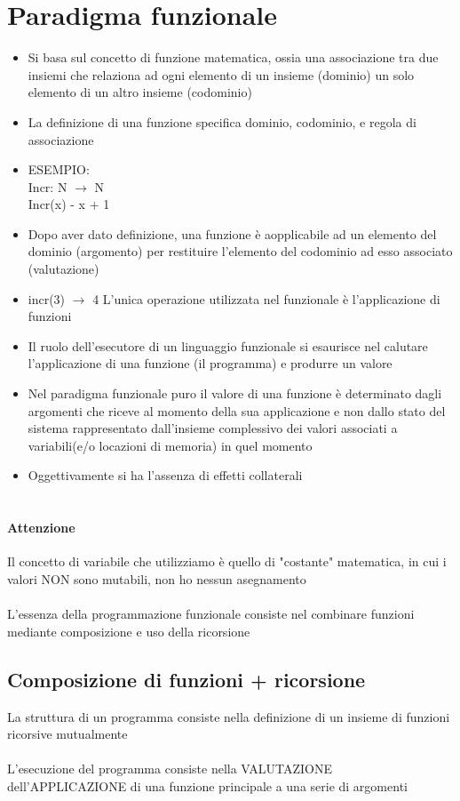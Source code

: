 \documentclass[12pt, a4paper, openany, oneside]{book}
\begin{document}
{\section{Paradigma funzionale}
\begin{itemize}
	\item 
	Si basa sul concetto di funzione matematica, ossia una associazione tra due 
	insiemi che relaziona ad ogni elemento di un insieme (dominio) un solo 
	elemento di un altro insieme (codominio)
	\item La definizione di una funzione specifica dominio, codominio, e regola
	di associazione 
	\\
	\item ESEMPIO: \\
	Incr: N $\to$ N \\
	Incr(x) - x + 1
	\item Dopo aver dato definizione, una funzione è aopplicabile ad un elemento del 
	dominio (argomento) per restituire l'elemento del codominio ad esso associato
	(valutazione)
	\item incr(3) $\to$ 4 
	L'unica operazione utilizzata nel funzionale è l'applicazione di funzioni  
	\item Il ruolo dell'esecutore di un linguaggio funzionale si esaurisce nel 
	calutare l'applicazione di una funzione (il programma) e produrre un valore 
	\item Nel paradigma funzionale puro il valore di una funzione è determinato 
	dagli argomenti che riceve al momento della sua applicazione e non dallo 
	stato del sistema rappresentato dall'insieme complessivo dei valori 
	associati a variabili(e/o locazioni di memoria) in quel momento 
	\item Oggettivamente si ha l'assenza di effetti collaterali \\ \\
\end{itemize}
\paragraph{Attenzione} %
\label{par:attenzione}
Il concetto di variabile che utilizziamo è quello di "costante" matematica, in 
cui i valori NON sono mutabili, non ho nessun asegnamento
\\ \\
L'essenza della programmazione funzionale consiste nel combinare funzioni 
mediante composizione e uso della ricorsione
\subsection{Composizione di funzioni + ricorsione} 
La struttura di un programma consiste nella definizione di un insieme di 
funzioni ricorsive mutualmente
\\ \\
L'esecuzione del programma consiste nella VALUTAZIONE dell'APPLICAZIONE di una
funzione principale a una serie di argomenti
}
\end{document}
